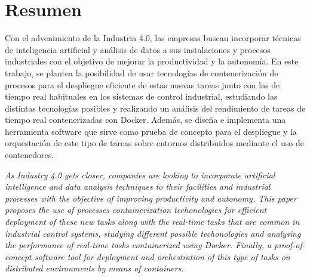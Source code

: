 
\chapter*{Resumen}

Con el advenimiento de la Industria 4.0, las empresas buscan incorporar técnicas
de inteligencia artificial y análisis de datos a sus instalaciones y procesos
industriales con el objetivo de mejorar la productividad y la autonomía. En este
trabajo, se plantea la posibilidad de usar tecnologías de contenerización de
procesos para el despliegue eficiente de estas nuevas tareas junto con las de
tiempo real habituales en los sistemas de control industrial, estudiando las
distintas tecnologías posibles y realizando un análisis del rendimiento de
tareas de tiempo real contenerizadas con Docker. Además, se diseña e implementa
una herramienta software que sirve como prueba de concepto para el despliegue y
la orquestación de este tipo de tareas sobre entornos distribuidos mediante el
uso de contenedores.

\textit{
    As Industry 4.0 gets closer, companies are looking to incorporate artificial
    intelligence and data analysis techniques to their facilities and industrial
    processes with the objective of improving productivity and autonomy. This paper
    proposes the use of processes containerization techonologies for efficient
    deployment of these new tasks along with the real-time tasks that are common in
    industrial control systems, studying different possible techonologies and
    analysing the performance of real-time tasks containerized using Docker.
    Finally, a proof-of-concept software tool for deployment and orchestration of
    this type of tasks on distributed environments by means of containers.
}


\cleardoublepage